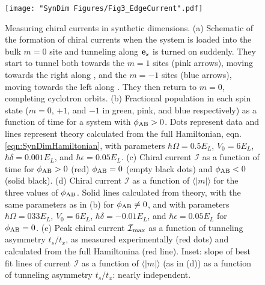 \begin{figure}
	\texttt{[image: "SynDim Figures/Fig3\_EdgeCurrent".pdf]}
\caption[Measuring chiral currents in synthetic dimensions]{Measuring chiral currents in synthetic dimensions. (a) Schematic of the formation of chiral currents when the system is loaded into the bulk $m=0$ site and tunneling along $\textbf{e}_s{}$ is turned on suddenly. They start to tunnel both towards the $m=1$ sites (pink arrows), moving towards the right along \ex{}, and the $m=-1$ sites (blue arrows), moving towards the left along \ex{}. They then return to $m=0$, completing cyclotron orbits. (b) Fractional population in each spin state ($m=0$, $+1$, and $-1$ in green, pink, and blue respectively) as a function of time for a system with $\phi_{\rm AB}>0$. Dots represent data and lines represent theory calculated from the full Hamiltonian, eqn. \ref{eqn:SynDimHamiltonian}, with parameters $\hbar\Omega=0.5 E_L$, $V_0=6 E_L$, $\hbar\delta=0.001 E_L$, and $\hbar\epsilon=0.05 E_L$. (c) Chiral current $\mathcal{I}$ as a function of time for $\phi_{\rm AB}>0$ (red) $\phi_{\rm AB}=0$ (empty black dots) and $\phi_{\rm AB}<0$ (solid black). (d) Chiral current $\mathcal{I}$ as a function of $\langle|m|\rangle$ for the three values of $\phi_{\rm AB}$. Solid lines calculated from theory, with the same parameters as in (b) for $\phi_{\rm AB}\neq0$, and with parameters $\hbar\Omega=033 E_L$, $V_0=6 E_L$, $\hbar\delta=-0.01 E_L$, and $\hbar\epsilon=0.05 E_L$ for $\phi_{\rm AB}=0$.  (e) Peak chiral current $\mathcal{I}_{\rm max}$ as a function of tunneling asymmetry $t_s/t_x$, as measured experimentally (red dots) and calculated from the full Hamiltonina (red line). Inset: slope of best fit lines of current $\mathcal{I}$ as a function of $\langle|m|\rangle$ (as in (d)) as a function of tunneling asymmetry $t_s/t_x$: nearly independent. }
\label{fig:edgeCurrents}
\end{figure}

